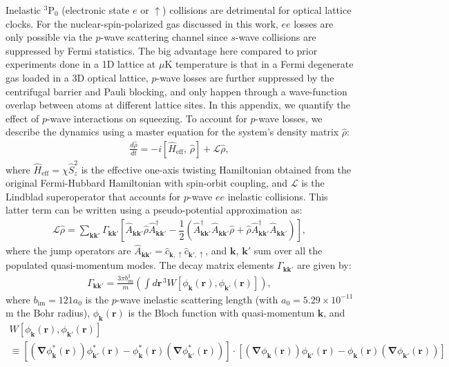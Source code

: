 \documentclass{nature}
\newcommand{\f}[2]{\dfrac{#1}{#2}} %
\newcommand{\p}[1]{\left(#1\right)} %
\renewcommand{\sp}[1]{\left[#1\right]} %
\newcommand{\up}{\uparrow}
\begin{document}
Inelastic $^{3}\text{P}_{0}$ (electronic state $e$ or $\up$) collisions are detrimental for optical lattice clocks. For the  nuclear-spin-polarized gas discussed in this work, $ee$ losses are only possible via the $p$-wave scattering channel since $s$-wave collisions are suppressed by Fermi statistics. The big advantage here compared to  prior experiments done in a 1D lattice at $\mu$K temperature\cite{martin2013quantum} is that in a Fermi  degenerate  gas loaded in a 3D optical lattice, $p$-wave losses are further suppressed by the centrifugal barrier and Pauli blocking, and only happen through a wave-function overlap between atoms at different lattice sites.  In this appendix, we quantify the effect of $p$-wave interactions on squeezing. To account for $p$-wave losses, we describe the dynamics  using a master equation for the system's density matrix $\hat{\rho}$:
\begin{align}
  \frac{d\hat{\rho}}{dt}
  = -i [\hat{H}_{\text{eff}},\,\hat{\rho}]
  + \mathcal{L}\hat{\rho},
\end{align}
where $\hat{H}_{\text{eff}}=\chi\hat{S}_z^2$ is the effective one-axis twisting Hamiltonian obtained from  the original Fermi-Hubbard Hamiltonian with spin-orbit coupling, and $\mathcal{L}$ is the Lindblad superoperator that accounts for $p$-wave $ee$ inelastic collisions. This latter term can be written using a pseudo-potential approximation as\cite{rey2014probing}:
\begin{align}
  \mathcal{L}\hat\rho
  = \sum_{{\bm k}{\bm k'}} \Gamma_{{\bm k}{\bm k'}}
  \sp{\hat{A}_{{\bm k}{\bm k'}} \hat\rho\hat{A}_{{\bm k}{\bm k'}}^\dag
  - \f12 \p{\hat{A}_{{\bm k}{\bm k'}}^\dag \hat{A}_{{\bm k}{\bm k'}} \hat\rho
+\hat\rho\hat{A}_{{\bm k}{\bm k'}}^\dag \hat{A}_{{\bm k}{\bm k'}}}},
\end{align}
where the jump operators are $\hat{A}_{{\bm k}{\bm k'}}=\hat{c}_{{\bm k},\up}\hat{c}_{{\bm k'},\up}$, and
$\bm k$, $\bm k'$ sum over all the populated quasi-momentum modes. The decay matrix elements $\Gamma_{{\bm k}{\bm k'}}$ are given by:
\begin{align}
  \Gamma_{{\bm k}{\bm k'}}
  = \frac{3\pi b_{\text{im}}^3 }{m} \p{\int d{\bm r}^{\,3}
    W[\phi_{{\bm k}}({\bm r}),\phi_{{\bm k'}}({\bm r})]},
\end{align}
where $b_{\text{im}} = 121 a_0$\cite{zhang2014spectroscopic, goban2018emergence} is the $p$-wave inelastic scattering length (with $ a_0=5.29\times 10 ^{-11}$ m the Bohr radius), $\phi_{{\bm k}}({\bm r})$ is the Bloch function with quasi-momentum ${\bm k}$, and
\begin{multline}
  W\sp{\phi_{{\bm k}}({\bm r}),\phi_{{\bm k'}}({\bm r})} \\
  \equiv \sp{\p{{\bm \nabla}\phi^{*}_{{\bm k}}(\bm r)}
  \phi^{*}_{{\bm k'}}(\bm r)-\phi^{*}_{{\bm k}}(\bm r)
  \p{{\bm \nabla}\phi^{*}_{{\bm k'}}(\bm r)}}
  \cdot\sp{\p{{\bm \nabla}\phi_{{\bm k}}(\bm r)}
  \phi_{{\bm k'}}(\bm r)-\phi_{{\bm k}}(\bm r)
  \p{{\bm \nabla}\phi_{{\bm k'}}(\bm r)}}
\end{multline}
\end{document}
